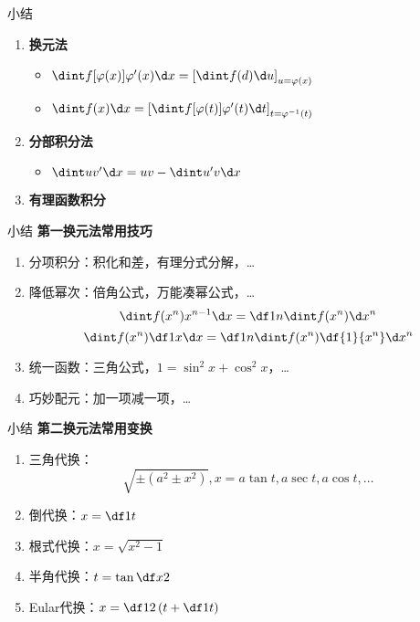 \begin{frame}[<+->]{小结}
	\linespread{1.5}
	\begin{enumerate}
	  \item {\bf 换元法}
	  \begin{itemize}
	    \item $\dint f[\varphi(x)]\varphi'(x)\d x=\left[\dint f(d)
	    \d u\right]_{u=\varphi(x)}$
	    \item $\dint f(x)\d x=\left[\dint	
	    f[\varphi(t)]\varphi'(t)\d t\right]_{t=\varphi^{-1}(t)}$
	  \end{itemize}
	  \item {\bf 分部积分法}
	  \begin{itemize}
	    \item $\dint uv'\d x=uv-\dint u'v\d x$
	  \end{itemize}
	  \item {\bf 有理函数积分}
	\end{enumerate}
\end{frame}

\begin{frame}{小结}
	\linespread{1.2}\pause 
 	{\bf 第一换元法常用技巧}\pause 
	\begin{enumerate}
	  \item {\bb 分项积分：}积化和差，有理分式分解，\ldots\pause 
	  \item {\bb 降低幂次：}倍角公式，万能凑幂公式，\ldots\pause 
	    $$\dint f(x^n)x^{n-1}\d x=\df 1n\dint f(x^n)\d x^n$$\pause 
	    $$\dint f(x^n)\df 1x\d x=\df 1n\dint f(x^n)\df{1}{x^n}\d x^n$$\pause 
	  \item {\bb 统一函数：}三角公式，$1=\sin^2x+\cos^2x$，\ldots\pause 
	  \item {\bb 巧妙配元：}加一项减一项，\ldots
	\end{enumerate}
\end{frame}

\begin{frame}{小结}
	\linespread{1.2}\pause 
 	{\bf 第二换元法常用变换}\pause 
	\begin{enumerate}
	  \item {\bb 三角代换：}\pause 
	  $$\sqrt{\pm(a^2\pm x^2)},x=a\tan t,a\sec t, a\cos t,\ldots$$\pause 
	  \item {\bb 倒代换：}$x=\df 1t$\pause 
	  \item {\bb 根式代换：}$x=\sqrt{x^2-1}$\pause 
	  \item {\bb 半角代换：}$t=\tan\df x2$\pause 
	  \item {\bb Eular代换：}$x=\df 12\left(t+\df 1t\right)$
	\end{enumerate}
\end{frame}

